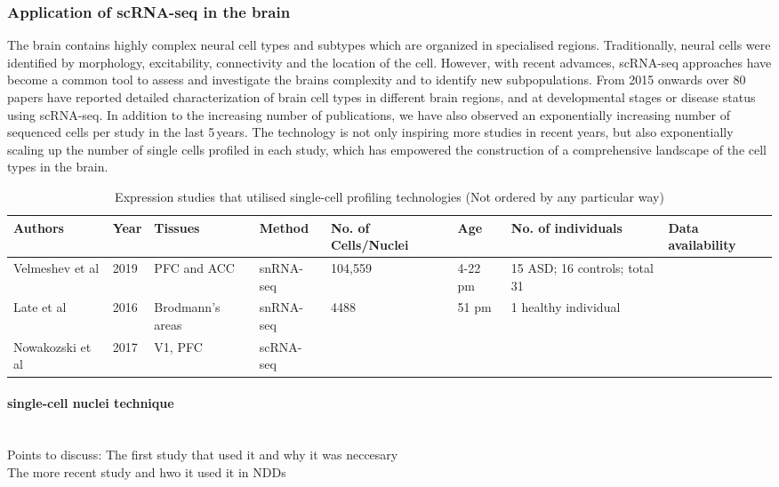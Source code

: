 \documentclass[12pt]{article}
\begin{document}
\subsubsection{Application of scRNA-seq in the brain}
The  brain contains highly complex neural cell types and subtypes which are organized in specialised regions. Traditionally, neural cells were identified by morphology, excitability, connectivity and the location of the cell. However, with recent advamces, scRNA-seq approaches have become a common tool to assess and investigate the brains complexity and to identify new subpopulations. From 2015 onwards over 80 papers have reported detailed characterization of brain cell types in different brain regions, and at developmental stages or disease status using scRNA-seq. In addition to the increasing number of publications, we have also observed an exponentially increasing number of sequenced cells per study in the last 5 years. The technology is not only inspiring more studies in recent years, but also exponentially scaling up the number of single cells profiled in each study, which has empowered the construction of a comprehensive landscape of the cell types in the brain.


\begin{landscape}

\begin{table}[!htp]
	\centering
	\footnotesize
	\caption{Expression studies that utilised single-cell profiling technologies (Not ordered by any particular way)}
	\begin{tabular}{|l|l|l|l|l|l|l|l|}
		\hline
		\textbf{Authors} &\textbf{Year}  & \textbf{Tissues} & \textbf{Method} & \textbf{No. of Cells/Nuclei}  & \textbf{Age} &  \textbf{No. of individuals} & \textbf{Data availability}  \\ \hline
		Velmeshev et al & 2019  &  PFC and ACC  & snRNA-seq  & 104,559 & 4-22 pm &15 ASD; 16 controls; total 31&  \\ \hline
		Late et al& 2016  & Brodmann's areas  & snRNA-seq & 4488 &51 pm & 1 healthy individual &  \\ \hline
		Nowakozski et al & 2017 &V1, PFC & scRNA-seq     & &&& \\ \hline
	\end{tabular}
\end{table}
\end{landscape}


\paragraph{single-cell nuclei technique}

~\\ Points to discuss: The first study that used it and why it was neccesary \\

The more recent study and hwo it used it in NDDs
\end{document}
